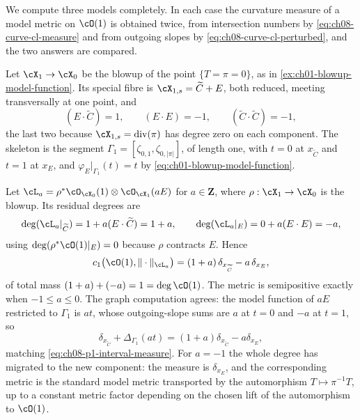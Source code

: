We compute three models completely.  In each case the curvature measure of a
model metric on $\cO(1)$ is obtained twice, from intersection numbers by
\eqref{eq:ch08-curve-cl-measure} and from outgoing slopes by
\eqref{eq:ch08-curve-cl-perturbed}, and the two answers are compared.

\begin{example}
\label{ex:ch08-p1-interval}
Let $\cX_1\to\cX_0$ be the blowup of the point $\{T=\pi=0\}$, as in
\cref{ex:ch01-blowup-model-function}.  Its special fibre is
$\cX_{1,s}=\widetilde C+E$, both reduced, meeting transversally at one point,
and
\[
 (E\cdot\widetilde C)=1,\qquad (E\cdot E)=-1,\qquad
 (\widetilde C\cdot\widetilde C)=-1 ,
\]
the last two because $\cX_{1,s}=\operatorname{div}(\pi)$ has degree zero on
each component.  The skeleton is the segment
$\Gamma_1=[\zeta_{0,1},\zeta_{0,|\pi|}]$, of length one, with $t=0$ at
$x_{\widetilde C}$ and $t=1$ at $x_E$, and
$\varphi_E|_{\Gamma_1}(t)=t$ by \eqref{eq:ch01-blowup-model-function}.

Let $\cL_a=\rho^*\cO_{\cX_0}(1)\otimes\cO_{\cX_1}(aE)$ for $a\in\mathbf Z$,
where $\rho:\cX_1\to\cX_0$ is the blowup.  Its residual degrees are
\[
 \deg(\cL_a|_{\widetilde C})=1+a(E\cdot\widetilde C)=1+a,
 \qquad
 \deg(\cL_a|_{E})=0+a(E\cdot E)=-a ,
\]
using $\deg(\rho^*\cO(1)|_E)=0$ because $\rho$ contracts $E$.  Hence
\begin{equation}
\label{eq:ch08-p1-interval-measure}
 c_1\bigl(\cO(1),\|\cdot\|_{\cL_a}\bigr)
   =(1+a)\,\delta_{x_{\widetilde C}}-a\,\delta_{x_E},
\end{equation}
of total mass $(1+a)+(-a)=1=\deg\cO(1)$.  The metric is semipositive exactly
when $-1\leq a\leq0$.  The graph computation agrees: the model function of
$aE$ restricted to $\Gamma_1$ is $at$, whose outgoing-slope sums are $a$ at
$t=0$ and $-a$ at $t=1$, so
\[
 \delta_{x_{\widetilde C}}+\Delta_{\Gamma_1}(at)
 =(1+a)\delta_{x_{\widetilde C}}-a\delta_{x_E},
\]
matching \eqref{eq:ch08-p1-interval-measure}.  For $a=-1$ the whole degree
has migrated to the new component: the measure is $\delta_{x_E}$, and the
corresponding metric is the standard model metric transported by the
automorphism $T\mapsto\pi^{-1}T$, up to a constant metric factor
depending on the chosen lift of the automorphism to $\cO(1)$.
\end{example}

